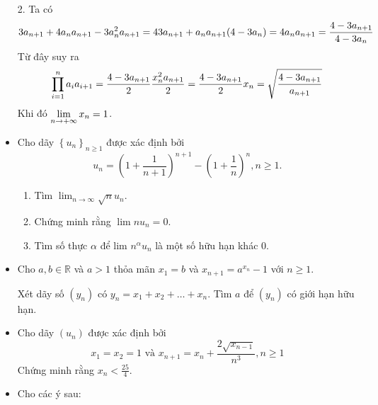 \documentclass[11pt]{scrartcl}
\begin{document}
\begin{itemize}[label=, leftmargin=0em, itemsep=0.5em]
\begin{sol}
        2. Ta có 
        \[
        3a_{n + 1} + 4a_{n}a_{n + 1} - 3a_{n}^2a_{n + 1} = 4 \lra 3a_{n + 1} +a_n a_{n + 1}(4 - 3a_n) = 4 \lra a_na_{n + 1} = \frac{4 - 3a_{n + 1}}{4 - 3a_n}
        \]
        Từ đây suy ra 
        \[
            \dprod_{i = 1}^n a_ia_{i + 1} = \frac{4- 3a_{n + 1}}{2} \lra \frac{x_n^2a_{n + 1}}{2} = \frac{4 - 3a_{n + 1}}{2} \ra x_n = \sqrt{\frac{4 - 3a_{n + 1}}{a_{n + 1}}}
        \]
        Khi đó $\displaystyle\lim_{n \to +\infty} x_n = 1$.
    \end{sol}
    \item\begin{btvn}
        Cho dãy $\left\{u_n\right\}_{n \geq 1}$ được xác định bởi
        $$
        u_n=\left(1+\frac{1}{n+1}\right)^{n+1}-\left(1+\frac{1}{n}\right)^n, n \geq 1 .
        $$
        \begin{enumerate}[label=(\alph*)]
            \item Tìm $\displaystyle \lim _{n \rightarrow \infty} \sqrt{n} u_n$.
            \item Chứng minh rằng $\lim n u_n=0$.
            \item Tìm số thực $\alpha$ để lim $n^\alpha u_n$ là một số hữu hạn khác 0.
        \end{enumerate}
    \end{btvn}

    \item \begin{btvn}
        Cho $a,b \in \mathbb{R}$ và $a > 1$ thỏa mãn $x_1 = b$ và $x_{n + 1}= a^{x_n} - 1$ với $n \geq 1$.
        
        Xét dãy số $(y_n)$ có $y_n = x_1 + x_2 +\dots+ x_n$. Tìm $a$ để $(y_n)$ có giới hạn hữu hạn.
    \end{btvn}
    \item \begin{btvn}
        Cho dãy $(u_n)$ được xác định bởi
        \[
            x_1 = x_2 = 1 \text{ và }x_{n + 1} = x_n + \frac{2\sqrt{x_{n - 1}}}{n^3}, n \geq 1
        \]
        Chứng minh rằng $x_n < \frac{25}{4}$.
    \end{btvn}
    \item \begin{btvn} Cho các ý sau:
    


\end{btvn}
\end{itemize}
\end{document}
